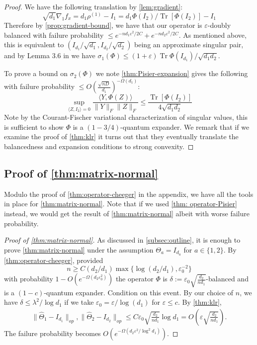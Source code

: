 \documentclass[aos]{imsart}
\theoremstyle{definition}
\DeclareMathOperator{\tr}{Tr}
\newcommand{\eps}{\varepsilon}
\begin{document}
\begin{proof}
We have the following translation by \cref{lem:gradient}:
\[ \sqrt{d_{1}} \nabla_{1} f_{x} = d_{1} \rho^{(1)} - I_{1} = d_{1} \Phi(I_{2})/ \tr[\Phi(I_{2})] - I_{1}  \]
Therefore by \cref{prop:gradient-bound}, we have that our operator is $\eps$-doubly balanced with failure probability $\leq e^{-n d_{1} \eps^2/2C} + e^{-n d_{2} \eps^2/2C}$. As mentioned above, this is equivalent to $(I_{d_1}/\sqrt{d_1}, I_{d_2}/\sqrt{d_2})$ being an approximate singular pair, and by Lemma 3.6 in \cite{KLR19} we have $\sigma_1(\Phi) \leq (1+\eps)  \tr \Phi(I_{d_1})/\sqrt{d_1 d_2}$.

To prove a bound on $\sigma_{2}(\Phi)$ we
note \cref{thm:Pisier-expansion} gives the following with failure probability $\leq O \left(\frac {\sqrt{nD}}{d_1}\right)^{ - \Omega(d_1)}$:
\[ \sup_{\langle Z, I_{2} \rangle = 0} \frac{\langle Y, \Phi(Z) \rangle}{\|Y\|_{F} \|Z\|_{F}} \leq \frac{\tr[\Phi(I_{2})]}{4 \sqrt{d_{1} d_{2}}}       \]
Note by the Courant-Fischer variational characterization of singular values, this is sufficient to show $\Phi$ is a $(1-3/4)$-quantum expander. We remark that if we examine the proof of \cref{thm:klr} it turns out that they eventually translate the balancedness and expansion conditions to strong convexity.
\end{proof}

\subsection{Proof of \cref{thm:matrix-normal}}
Modulo the proof of \cref{thm:operator-cheeger} in the appendix, we have all the tools in place for \cref{thm:matrix-normal}. Note that if we used \cref{thm: operator-Pisier} instead, we would get the result of \cref{thm:matrix-normal} albeit with worse failure probability.

\begin{proof}[Proof of \cref{thm:matrix-normal}] As discussed in \cref{subsec:outline}, it is enough to prove \cref{thm:matrix-normal} under the assumption $\Theta_a = I_{d_a}$ for $a \in \{1,2\}$. By \cref{thm:operator-cheeger}, provided 
$$n \geq C (d_2/d_1) \max\{\log (d_2/d_1),  \eps_0^{-2}\} $$
 with probability $1 - O(e^{ - \Omega( d_2 \eps_0^2)})$ the operator $\Phi$ is $\delta:=\eps_0  \sqrt{\frac{d_2}{n d_1}}$-balanced and is a $(1 - c)$-quantum expander. Condition on this event. By our choice of $n$, we have $\delta \leq \lambda^2/\log d_1$ if we take $\eps_0 = \eps/\log(d_1)$ for $\eps \leq c$. By \cref{thm:klr},
\begin{gather*} \| \widehat{\Theta}_1 - I_{d_1}\|_{op}, \| \widehat{\Theta}_2 - I_{d_2}\|_{op} \leq C \eps_0 \sqrt{\frac{d_2}{n d_1}} \log d_1 = O\left(\eps \sqrt{\frac{d_2}{n d_1}}\right).\end{gather*}
The failure probability becomes $O(e^{ - \Omega( d_2 \eps^2/\log^2 d_1)})$.
\end{proof}
\end{document}
